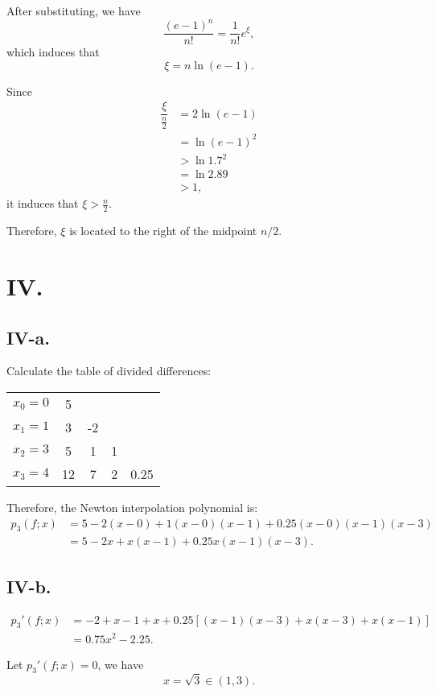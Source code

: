 \documentclass[a4paper]{article}
\begin{document}
After substituting, we have
$$
  \frac{(e - 1)^n}{n!} = \frac{1}{n!} e^\xi,
$$
which induces that
$$
 \xi = n \ln(e - 1).
$$

Since 
$$
\begin{aligned}
  \dfrac{\xi}{\frac{n}{2}} &= 2 \ln(e-1) \\
  &= \ln(e - 1)^2 \\
  &> \ln 1.7^2 \\
  &= \ln 2.89 \\
  &> 1,
\end{aligned}
$$
it induces that $\xi > \frac{n}{2}$.
   
Therefore, $\xi$ is located to the right of the midpoint $n/2$.


\section*{IV.}

\subsection*{IV-a.}
Calculate the table of divided differences:

\begin{tabular}{c|cccc}
  $x_0 = 0$ & 5 &   &  &   \\
  $x_1 = 1$ & 3 & -2 &  &   \\
  $x_2 = 3$ & 5 & 1 & 1 &   \\
  $x_3 = 4$ & 12 & 7 & 2 & 0.25 \\
\end{tabular}

Therefore, the Newton interpolation polynomial is:
$$
\begin{aligned}
  p_3(f;x) &= 5 - 2(x - 0) + 1(x - 0)(x - 1) + 0.25(x - 0)(x - 1)(x - 3)\\
  &= 5 - 2x + x(x - 1) + 0.25x(x - 1)(x - 3).
\end{aligned}
$$
  

\subsection*{IV-b.}
$$
\begin{aligned}
  p_3'(f;x) &= -2 + x - 1 + x + 0.25 \left[ (x - 1)(x - 3) + x(x - 3) + x(x - 1) \right]   \\
  &= 0.75x^2 - 2.25.
\end{aligned}
$$

Let $p_3'(f;x) = 0$, we have
$$
  x = \sqrt{3} \in (1, 3).
$$
\end{document}
